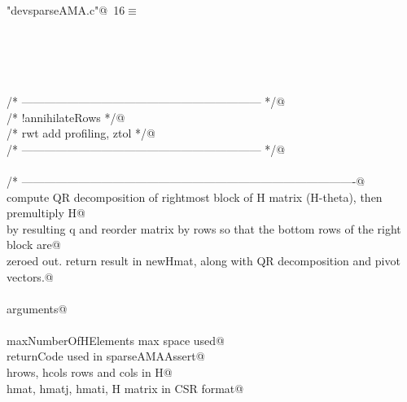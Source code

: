 \documentclass[12pt]{article}
\begin{document}
\begin{flushleft} \small
\begin{minipage}{\linewidth}\label{scrap4}\raggedright\small
{} \verb@"devsparseAMA.c"@\nobreak\ {\footnotesize {16}}$\equiv$
\vspace{-1ex}
\begin{list}{}{} \item
\mbox{}\verb@@\\
\mbox{}\verb@@\\
\mbox{}\verb@@\\
\mbox{}\verb@@\\
\mbox{}\verb@/* --------------------------------------------------------------- */@\\
\mbox{}\verb@/* !annihilateRows                                                 */@\\
\mbox{}\verb@/* rwt add profiling, ztol                                         */@\\
\mbox{}\verb@/* --------------------------------------------------------------- */@\\
\mbox{}\verb@@\\
\mbox{}\verb@/* ----------------------------------------------------------------------------------------@\\
\mbox{}\verb@    compute QR decomposition of rightmost block of H matrix (H-theta), then premultiply H@\\
\mbox{}\verb@    by resulting q and reorder matrix by rows so that the bottom rows of the right block are@\\
\mbox{}\verb@    zeroed out.  return result in newHmat, along with QR decomposition and pivot vectors.@\\
\mbox{}\verb@@\\
\mbox{}\verb@        arguments@\\
\mbox{}\verb@@\\
\mbox{}\verb@                maxNumberOfHElements                                            max space used@\\
\mbox{}\verb@            returnCode                                                                  used in sparseAMAAssert@\\
\mbox{}\verb@            hrows, hcols                                                                rows and cols in H@\\
\mbox{}\verb@            hmat, hmatj, hmati,                                                 H matrix in CSR format@\\

\end{list}
\end{minipage}
\end{flushleft}
\end{document}
